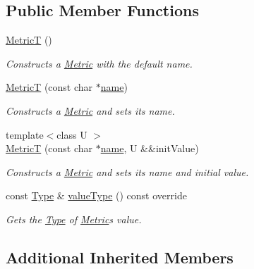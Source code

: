 \subsection*{Public Member Functions}
\begin{DoxyCompactItemize}
\item 
\hyperlink{structdg_1_1deepcore_1_1_metric_t_a3757a1293ee9f715831bd673b922829b}{MetricT} ()
\begin{DoxyCompactList}\small\item\em Constructs a \hyperlink{classdg_1_1deepcore_1_1_metric}{Metric} with the default name. \end{DoxyCompactList}\item 
\hyperlink{structdg_1_1deepcore_1_1_metric_t_a6364ff036e903e63e8b7d97d2c2791f6}{MetricT} (const char $\ast$\hyperlink{classdg_1_1deepcore_1_1_named_object_ab1379a28467dd39a81ceb02cf50dedde}{name})
\begin{DoxyCompactList}\small\item\em Constructs a \hyperlink{classdg_1_1deepcore_1_1_metric}{Metric} and sets its name. \end{DoxyCompactList}\item 
{\footnotesize template$<$class U $>$ }\\\hyperlink{structdg_1_1deepcore_1_1_metric_t_ac8052af63c5191e260be05602fb8057f}{MetricT} (const char $\ast$\hyperlink{classdg_1_1deepcore_1_1_named_object_ab1379a28467dd39a81ceb02cf50dedde}{name}, U \&\&init\+Value)
\begin{DoxyCompactList}\small\item\em Constructs a \hyperlink{classdg_1_1deepcore_1_1_metric}{Metric} and sets its name and initial value. \end{DoxyCompactList}\item 
const \hyperlink{classdg_1_1deepcore_1_1_type}{Type} \& \hyperlink{structdg_1_1deepcore_1_1_metric_t_a171054fd7df03fbeba5118727bda15f3}{value\+Type} () const override
\begin{DoxyCompactList}\small\item\em Gets the \hyperlink{classdg_1_1deepcore_1_1_type}{Type} of \hyperlink{classdg_1_1deepcore_1_1_metric}{Metric}\textquotesingle{}s value. \end{DoxyCompactList}\end{DoxyCompactItemize}
\subsection*{Additional Inherited Members}


